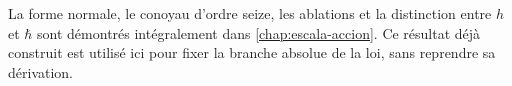 La forme normale, le conoyau d’ordre seize, les ablations et la distinction entre \(h\) et \(\hbar\) sont démontrés intégralement dans \cref{chap:escala-accion}. Ce résultat déjà construit est utilisé ici pour fixer la branche absolue de la loi, sans reprendre sa dérivation.
\begingroup
\let\chapter\section
\let\section\subsection
\let\subsection\subsubsection
\let\subsubsection\paragraph
\let\clearpage\relax

\endgroup
\begingroup
\let\chapter\section
\let\section\subsection
\let\subsection\subsubsection
